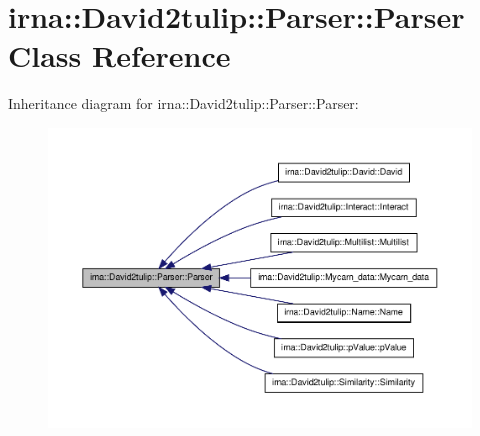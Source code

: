 \hypertarget{classirna_1_1David2tulip_1_1Parser_1_1Parser}{
\section{irna\-:\-:\-David2tulip\-:\-:\-Parser\-:\-:\-Parser \-Class \-Reference}
\label{classirna_1_1David2tulip_1_1Parser_1_1Parser}
}


\-Inheritance diagram for irna\-:\-:\-David2tulip\-:\-:\-Parser\-:\-:\-Parser\-:\nopagebreak
\begin{figure}[H]
\begin{center}
\leavevmode
\includegraphics[width=350pt]{classirna_1_1David2tulip_1_1Parser_1_1Parser__inherit__graph}
\end{center}
\end{figure}
